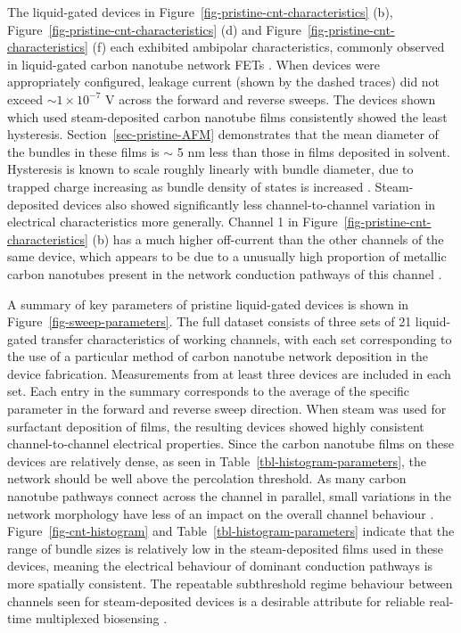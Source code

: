 \documentclass[
  a4paper,
]{scrbook}
\begin{document}
The liquid-gated devices in
Figure~\ref{fig-pristine-cnt-characteristics} (b),
Figure~\ref{fig-pristine-cnt-characteristics} (d) and
Figure~\ref{fig-pristine-cnt-characteristics} (f) each exhibited
ambipolar characteristics, commonly observed in liquid-gated carbon
nanotube network FETs
\autocite{Kauffman2008,Heller2009,JongYu2009,Derenskyi2014,Murugathas2018,Albarghouthi2022}.
When devices were appropriately configured, leakage current (shown by
the dashed traces) did not exceed \(\sim 1 \times 10^{-7}\) V across the
forward and reverse sweeps. The devices shown which used steam-deposited
carbon nanotube films consistently showed the least hysteresis.
Section~\ref{sec-pristine-AFM} demonstrates that the mean diameter of
the bundles in these films is \(\sim\) 5 nm less than those in films
deposited in solvent. Hysteresis is known to scale roughly linearly with
bundle diameter, due to trapped charge increasing as bundle density of
states is increased \autocite{Pop2009}. Steam-deposited devices also
showed significantly less channel-to-channel variation in electrical
characteristics more generally. Channel 1 in
Figure~\ref{fig-pristine-cnt-characteristics} (b) has a much higher
off-current than the other channels of the same device, which appears to
be due to a unusually high proportion of metallic carbon nanotubes
present in the network conduction pathways of this channel
\autocite{Rouhi2011,Zaumseil2015}.

A summary of key parameters of pristine liquid-gated devices is shown in
Figure~\ref{fig-sweep-parameters}. The full dataset consists of three
sets of 21 liquid-gated transfer characteristics of working channels,
with each set corresponding to the use of a particular method of carbon
nanotube network deposition in the device fabrication. Measurements from
at least three devices are included in each set. Each entry in the
summary corresponds to the average of the specific parameter in the
forward and reverse sweep direction. When steam was used for surfactant
deposition of films, the resulting devices showed highly consistent
channel-to-channel electrical properties. Since the carbon nanotube
films on these devices are relatively dense, as seen in
Table~\ref{tbl-histogram-parameters}, the network should be well above
the percolation threshold. As many carbon nanotube pathways connect
across the channel in parallel, small variations in the network
morphology have less of an impact on the overall channel behaviour
\autocite{Murugathas2018}. Figure~\ref{fig-cnt-histogram} and
Table~\ref{tbl-histogram-parameters} indicate that the range of bundle
sizes is relatively low in the steam-deposited films used in these
devices, meaning the electrical behaviour of dominant conduction
pathways is more spatially consistent. The repeatable subthreshold
regime behaviour between channels seen for steam-deposited devices is a
desirable attribute for reliable real-time multiplexed biosensing
\autocite{Kauffman2008,Heller2009,Gao2010}.
\end{document}
